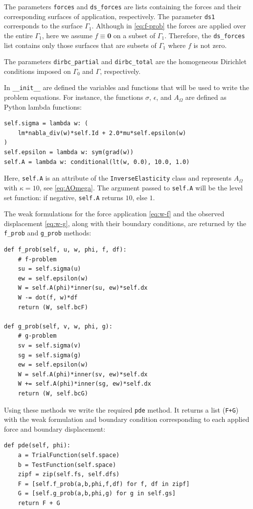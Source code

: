 \documentclass[iicol,pdflatex,sn-mathphys-ay]{sn-jnl}%
\theoremstyle{thmstyleone}%
\theoremstyle{thmstyletwo}%
\theoremstyle{thmstylethree}%
\begin{document}
The parameters \texttt{forces} and \texttt{ds\_forces} are lists
containing the forces and their corresponding surfaces of application, respectively.
The parameter \texttt{ds1} corresponds to the surface $\Gamma_1$.
Although in \eqref{eq:f-prob} the forces are applied over the entire $\Gamma_1$,
here we assume $f\equiv\textbf{0}$ on a subset of $\Gamma_1$.
Therefore, the \texttt{ds\_forces} list contains only those surfaces
that are subsets of $\Gamma_1$ where $f$ is not zero.

The parameters \texttt{dirbc\_partial} and \texttt{dirbc\_total} are
the homogeneous Dirichlet conditions imposed on $\Gamma_0$ and $\Gamma$,
respectively.

In \texttt{\_\_init\_\_} are defined the variables and functions
that will be used to write the problem equations.
For instance, the functions $\sigma$, $\epsilon$, and $A_\Omega$
are defined as Python lambda functions:
\begin{lstlisting}
self.sigma = lambda w: (
	lm*nabla_div(w)*self.Id + 2.0*mu*self.epsilon(w)
)
self.epsilon = lambda w: sym(grad(w))
self.A = lambda w: conditional(lt(w, 0.0), 10.0, 1.0)
\end{lstlisting}
Here, \texttt{self.A} is an attribute of the \texttt{InverseElasticity} class
and represents $A_\Omega$ with $\kappa = 10$, see \eqref{eq:AOmega}.
The argument passed to \texttt{self.A} will be the level set function:
if negative, \texttt{self.A} returns $10$, else $1$.

The weak formulations for the force application \eqref{eq:w-f} and
the observed displacement \eqref{eq:w-g},
along with their boundary conditions, are returned
by the \texttt{f\_prob} and \texttt{g\_prob} methods:
\begin{lstlisting}
def f_prob(self, u, w, phi, f, df):
	# f-problem
	su = self.sigma(u)
	ew = self.epsilon(w)
	W = self.A(phi)*inner(su, ew)*self.dx
	W -= dot(f, w)*df
	return (W, self.bcF)

def g_prob(self, v, w, phi, g):
	# g-problem
	sv = self.sigma(v)
	sg = self.sigma(g)
	ew = self.epsilon(w)
	W = self.A(phi)*inner(sv, ew)*self.dx
	W += self.A(phi)*inner(sg, ew)*self.dx
	return (W, self.bcG)
\end{lstlisting}

Using these methods we write the required \texttt{pde} method.
It returns a list (\texttt{F+G}) with the weak formulation
and boundary condition corresponding
to each applied force and boundary displacement:
\begin{lstlisting}
def pde(self, phi):
	a = TrialFunction(self.space)
	b = TestFunction(self.space)
	zipf = zip(self.fs, self.dfs)
	F = [self.f_prob(a,b,phi,f,df) for f, df in zipf]
	G = [self.g_prob(a,b,phi,g) for g in self.gs]
	return F + G
\end{lstlisting}
\end{document}
